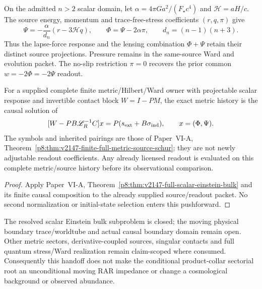 \documentclass[12pt,a4paper]{article}
\begin{document}
\begin{corollary}
\label{p9:cor:v1108-full-scalar-readout}
On the admitted $n>2$ scalar domain, let
$\alpha=4\pi Ga^2/(F_\star c^4)$ and $\mathcal H=aH/c$.
The source energy, momentum and trace-free-stress coefficients $(r,q,\pi)$
give
\[
 \Psi=-\frac{\alpha}{d_n}(r-3\mathcal Hq),\qquad
 \Phi=\Psi-2\alpha\pi,\qquad d_n=(n-1)(n+3).
\]
Thus the lapse-force response and the lensing combination $\Phi+\Psi$ retain
their distinct source projections.  Pressure remains in the same-source Ward
and evolution packet.  The no-slip restriction $\pi=0$ recovers the prior
common $w=-2\Phi=-2\Psi$ readout.

For a supplied complete finite metric/Hilbert/Ward owner with projectable
scalar response and invertible contact block $W=I-PM$, the exact metric history
is the causal solution of
\[
 [W-PB\mathscr L_R^{-1}C]x
 =P(s_{\rm ext}+B\sigma_{\rm ind}),\qquad x=(\Phi,\Psi).
\]
The symbols and inherited pairings are those of Paper~VI-A,
Theorem~\ref{p8:thm:v2147-finite-full-metric-source-schur}; they are not newly
adjustable readout coefficients.  Any already licensed readout is evaluated
on this complete metric/source history before its observational comparison.
\end{corollary}
\begin{proof}
Apply Paper~VI-A,
Theorem~\ref{p8:thm:v2147-full-scalar-einstein-bulk} and its finite causal
composition to the already supplied source/readout packet.  No second
normalization or initial-state selection enters this pushforward.
\end{proof}

The resolved scalar Einstein bulk subproblem is closed; the moving physical
boundary trace/worldtube and actual causal boundary domain remain open.
Other metric sectors, derivative-coupled sources, singular contacts and full
quantum stress/Ward realization remain claim-scoped where consumed.
Consequently this handoff does not make the conditional product-collar
sectorial root an unconditional moving RAR impedance or change a cosmological
background or observed abundance.




\end{document}
